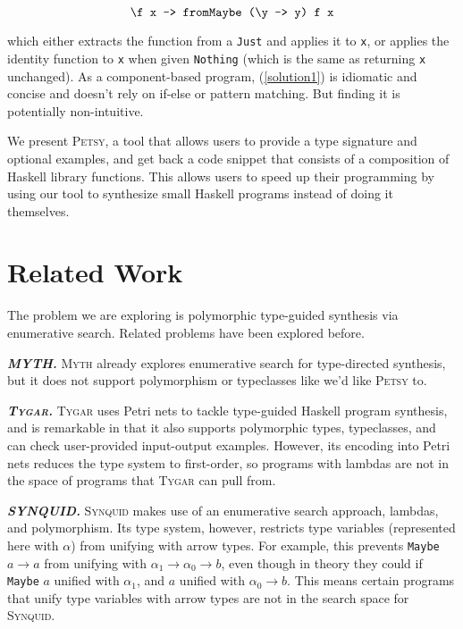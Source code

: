 \documentclass[acmsmall,nonacm]{acmart}
\begin{document}
\begin{equation}
  \label{solution1}
  \verb|\f x -> fromMaybe (\y -> y) f x|
\end{equation}

\noindent which either extracts the function from a \verb|Just| and applies it to \verb|x|, 
or applies the identity function to \verb|x| when given \verb|Nothing|
(which is the same as returning \verb|x| unchanged). As a component-based program, 
(\ref{solution1}) is idiomatic and concise and doesn't rely on if-else or pattern matching.
But finding it is potentially non-intuitive.

We present \textsc{Petsy}, a tool that allows users to provide a type signature and 
optional examples, and get back a code snippet 
that consists of a composition of Haskell library functions. This allows
users to speed up their programming by using our tool to synthesize small 
Haskell programs instead of doing it themselves. 




\section{Related Work}

The problem we are exploring is polymorphic type-guided synthesis via 
enumerative search. Related problems have been explored before. 

\vspace{2mm}
\noindent \textbf{\textit{MYTH.}} \textsc{Myth} \cite{myth}
already explores enumerative search for 
type-directed synthesis, but it does not support polymorphism or typeclasses 
like we'd like \textsc{Petsy} to. 

\vspace{2mm}
\noindent \textbf{\textit{\textsc{Tygar}.}} \textsc{Tygar} \cite{tygar} uses Petri nets to 
tackle type-guided Haskell program synthesis, and is remarkable in that 
it also supports polymorphic types, typeclasses, and can check 
user-provided input-output examples. However, its encoding into Petri nets 
reduces the type system to first-order, so programs with lambdas are not in the
space of programs that \textsc{Tygar} can pull from.

\vspace{2mm}
\noindent \textbf{\textit{SYNQUID.}} \textsc{Synquid} \cite{synquid} makes 
use of an enumerative search approach, lambdas, and polymorphism. 
Its type system, however, restricts type variables (represented here with $\alpha$)
from unifying with arrow types. For example, this prevents
\texttt{Maybe} ${a \to a}$ from unifying with
${\alpha_1 \to \alpha_0 \to b}$, even though in theory
they could if \texttt{Maybe} $a$ unified with $\alpha_1$, and $a$ unified 
with $\alpha_0 \to b$.
This means certain programs that unify type variables with arrow types
are not in the search space for \textsc{Synquid}.
\end{document}
